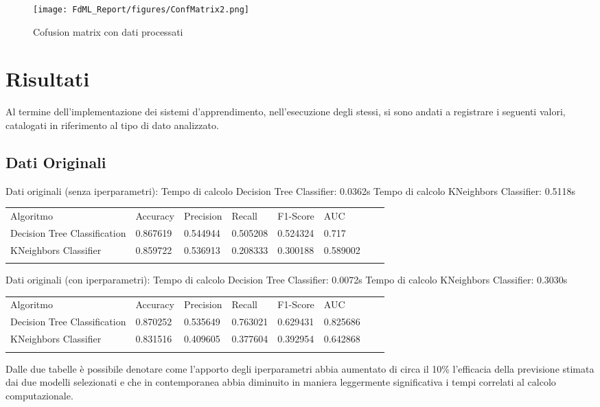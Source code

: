 \documentclass[10pt,a4paper]{article}
\begin{document}
 \begin{figure}[ht]
     \centering
     \texttt{[image: FdML\_Report/figures/ConfMatrix2.png]}
     \caption{Cofusion matrix con dati processati}
     \label{fig:my_label}
 \end{figure}

\clearpage

\section{Risultati}
Al termine dell'implementazione dei sistemi d'apprendimento, nell'esecuzione degli stessi, si sono andati a registrare i seguenti valori, catalogati in riferimento al tipo di dato analizzato.
\subsection{Dati Originali}
Dati originali (senza iperparametri):\hfill \break
Tempo di calcolo Decision Tree Classifier:  0.0362s\hfill \break
Tempo di calcolo KNeighbors Classifier:     0.5118s\hfill \break
\begin{table}[ht]
\centering
\begin{tabular}{llllllll}
Algoritmo                    & Accuracy & Precision & Recall   & F1-Score & AUC      &  &   \\
Decision Tree Classification & 0.867619 & 0.544944  & 0.505208 & 0.524324 & 0.717    &  &   \\
KNeighbors Classifier        & 0.859722 & 0.536913  & 0.208333 & 0.300188 & 0.589002 &  &   \\
                             &          &           &          &          &          &  &  
\end{tabular}
\end{table}

\hfill \break
Dati originali (con iperparametri):\hfill \break
Tempo di calcolo Decision Tree Classifier:  0.0072s\hfill \break
Tempo di calcolo KNeighbors Classifier:     0.3030s\hfill \break
\begin{table}[ht]
\centering
\begin{tabular}{llllllll}
Algoritmo                    & Accuracy & Precision & Recall   & F1-Score & AUC      &  &   \\
Decision Tree Classification & 0.870252 & 0.535649  & 0.763021 & 0.629431 & 0.825686 &  &   \\
KNeighbors Classifier        & 0.831516 & 0.409605  & 0.377604 & 0.392954 & 0.642868 &  &   \\
                             &          &           &          &          &          &  &  
\end{tabular}
\end{table}
\hfill \break
Dalle due tabelle è possibile denotare come l'apporto degli iperparametri abbia aumentato di circa il 10\% l'efficacia della previsione stimata dai due modelli selezionati e che in contemporanea abbia diminuito in maniera leggermente significativa i tempi correlati al calcolo computazionale.\hfill\break
\clearpage
\end{document}
